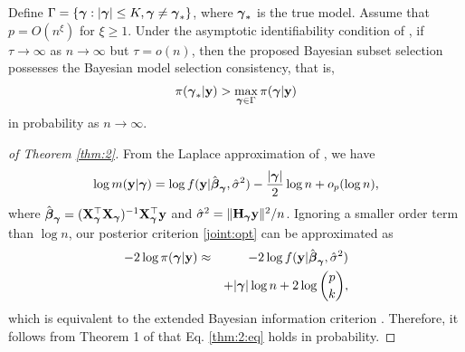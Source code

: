 \begin{theorem}\label{thm:2} Define $\Gamma=\{{\boldsymbol \gamma}:|{\boldsymbol \gamma}|\leq K,{\boldsymbol \gamma}\neq {\boldsymbol \gamma}_*\}$, where ${\boldsymbol \gamma}_*$ is the true model.  Assume that $p=O(n^\xi)$ for $\xi\geq 1$. Under the asymptotic identifiability condition of \citet{chen2008extended}, if $\tau\to \infty$ as $n\to \infty$ but $\tau=o(n)$, then the proposed Bayesian subset selection possesses the Bayesian model selection consistency, that is,
\begin{eqnarray}\label{thm:2:eq}
\pi({\boldsymbol \gamma}_*|{\bf y}) > \max_{ {\boldsymbol \gamma} \in \Gamma }\pi({\boldsymbol \gamma}|{\bf y})
\end{eqnarray}
in probability as $n\to \infty$.
\end{theorem}
\begin{proof}[of Theorem \ref{thm:2}]  From the Laplace approximation of \citet{kass1995}, we have
\begin{eqnarray*}
\log m({\bf y}|{\boldsymbol \gamma}) = \log f({\bf y}|\hat{{\boldsymbol \beta}}_{\boldsymbol \gamma}, \hat{\sigma}^2)-\frac{|{\boldsymbol \gamma}|}{2}\log n+o_p(\log n ),
\end{eqnarray*}
where  $\hat{{\boldsymbol \beta}}_{\boldsymbol \gamma}= ({\bf X}_{\boldsymbol \gamma}^{ \top} {\bf X}_{{\boldsymbol \gamma}})^{-1} {\bf X}_{{\boldsymbol \gamma}}^{ \top} {\bf y}$ and $\hat{\sigma}^2=\|{\bf H}_{{\boldsymbol \gamma}}{\bf y}\|^2/n$. Ignoring a smaller order term than $\log n$, our posterior criterion \eqref{joint:opt} can be approximated as 
\begin{eqnarray}
\nonumber -2 \log \pi({\boldsymbol \gamma} |{\bf y}) &\approx& -2 \log f({\bf y}|\hat{{\boldsymbol \beta}}_{\boldsymbol \gamma},\hat{\sigma}^2)\\
\label{ebic}&&+{|{\boldsymbol \gamma}|}\log n+2\log \binom{p}{k},
\end{eqnarray}
which is equivalent to the extended Bayesian information criterion \citep{chen2008extended}. Therefore, it follows from Theorem 1 of \citet{chen2008extended} that Eq. \eqref{thm:2:eq} holds in probability.
\end{proof}



